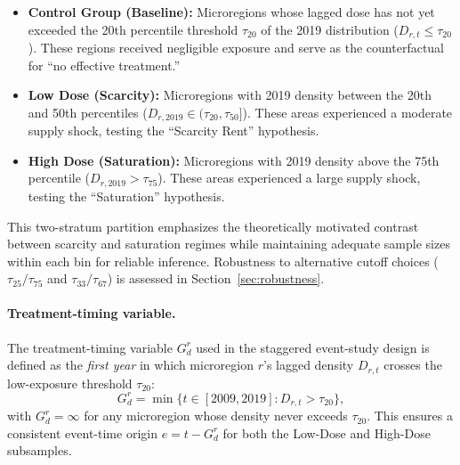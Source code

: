 \begin{itemize}
    \item \textbf{Control Group (Baseline):} Microregions whose lagged dose has not yet exceeded the 20th percentile threshold $\tau_{20}$ of the 2019 distribution ($D_{r,t} \leq \tau_{20}$). These regions received negligible exposure and serve as the counterfactual for ``no effective treatment.''
    \item \textbf{Low Dose (Scarcity):} Microregions with 2019 density between the 20th and 50th percentiles ($D_{r,2019} \in (\tau_{20}, \tau_{50}]$). These areas experienced a moderate supply shock, testing the ``Scarcity Rent'' hypothesis.
    \item \textbf{High Dose (Saturation):} Microregions with 2019 density above the 75th percentile ($D_{r,2019} > \tau_{75}$). These areas experienced a large supply shock, testing the ``Saturation'' hypothesis.
\end{itemize}

This two-stratum partition emphasizes the theoretically motivated contrast between scarcity and saturation regimes while maintaining adequate sample sizes within each bin for reliable inference. Robustness to alternative cutoff choices ($\tau_{25}/\tau_{75}$ and $\tau_{33}/\tau_{67}$) is assessed in Section~\ref{sec:robustness}.


\paragraph{Treatment-timing variable.}
The treatment-timing variable $G_d^r$ used in the staggered event-study design is defined as the \emph{first year} in which microregion $r$'s lagged density $D_{r,t}$ crosses the low-exposure threshold $\tau_{20}$:
\begin{equation}
    G_d^r = \min\bigl\{t \in [2009, 2019] : D_{r,t} > \tau_{20}\bigr\},
    \label{eq:first_treat}
\end{equation}
with $G_d^r = \infty$ for any microregion whose density never exceeds $\tau_{20}$. This ensures a consistent event-time origin $e = t - G_d^r$ for both the Low-Dose and High-Dose subsamples.



